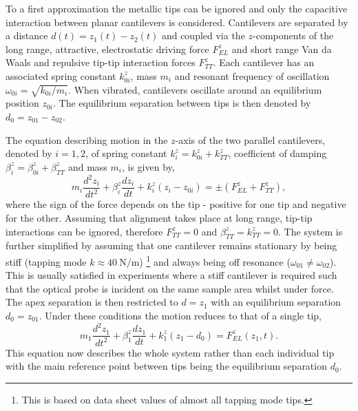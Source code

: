 \documentclass{article}
\begin{document}
To a first approximation the metallic tips can be ignored and only the capacitive interaction between planar cantilevers is considered. Cantilevers are separated by a distance $d(t) = z_1(t) - z_2(t)$ and coupled via the $z$-components of the long range, attractive, electrostatic driving force $F_{EL}^z$ and short range  Van da Waals and repulsive tip-tip interaction forces $F_{TT}^z$. Each cantilever has an associated spring constant $k_{0i}^z$, mass $m_i$ and resonant frequency of oscillation $\omega_{0i} = \sqrt{k_{0i}/m_i}$. When vibrated, cantilevers oscillate around an equilibrium position $z_{0i}$. The equilibrium separation between tips is then denoted by $d_0 = z_{01} - z_{02}$.

The equation describing motion in the $z$-axis of the two parallel cantilevers, denoted by $i=1,2$, of spring constant $k_i^z=k_{0i}^z+k_{TT}^z$, coefficient of damping $\beta_i^z=\beta_{0i}^z+\beta_{TT}^z$ and mass $m_i$, is given by,
\begin{equation}
	m_i\frac{d^2z_i}{dt^2}+\beta_i^z\frac{dz_i}{dt}+k_i^z\left(z_i-z_{0i}\right)=\pm\left(F_{EL}^z+F_{TT}^z\right),
\end{equation}
where the sign of the force depends on the tip - positive for one tip and negative for the other.
Assuming that alignment takes place at long range, tip-tip interactions can be ignored, therefore $F_{TT}^z = 0$ and $\beta_{TT}^{z} = k_{TT}^{z} = 0$. The system is further simplified by assuming that one cantilever remains stationary by being stiff (tapping mode $k\approx\SI{40}{\newton\per\metre}$)%
\footnote{This is based on data sheet values of almost all tapping mode tips.}
and always being off resonance ($\omega_{01} \neq \omega_{02}$). This is usually satisfied in experiments where a stiff cantilever is required such that the optical probe is incident on the same sample area whilst under force. The apex separation is then restricted to $d=z_1$ with an equilibrium separation $d_0 = z_{01}$. Under these conditions the motion reduces to that of a single tip,
\begin{equation}
	m_1\frac{d^2z_1}{dt^2}+\beta_1^z\frac{dz_1}{dt}+k_1^z\left(z_1-d_0\right) = F_{EL}^z(z_1, t).
	\label{eq:simple_eom}
\end{equation}
This equation now describes the whole system rather than each individual tip with the main reference point between tips being the equilibrium separation $d_0$.
\end{document}
